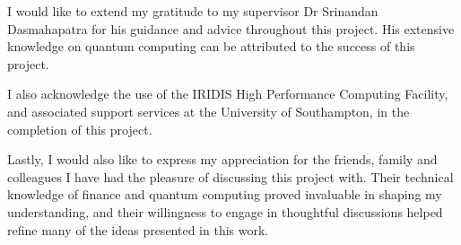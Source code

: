 \documentclass[12pt]{article}
\newcommand{\newp}
    {
    \vskip 0.5cm 
  }
\numberwithin{equation}{section}
\begin{document}
\begin{center}
\begin{minipage}{0.8\textwidth} %

I would like to extend my gratitude to my supervisor Dr Srinandan Dasmahapatra for his guidance and advice throughout this project. His extensive knowledge on quantum computing can be 
attributed to the success of this project.
\newp
I also acknowledge the use of the IRIDIS High Performance Computing Facility, and
associated support services at the University of Southampton, in the completion of this project.
\newp
Lastly, I would also like to express my appreciation for the friends, family and colleagues I have had the pleasure of discussing this project with. Their technical knowledge of finance and quantum computing proved invaluable in shaping my understanding, and their willingness to engage in thoughtful discussions helped refine many of the ideas presented in this work.


\end{minipage}
\end{center}
\vspace*{\fill} %
\cleardoublepage
\clearpage

\tableofcontents
\clearpage



\end{document}
